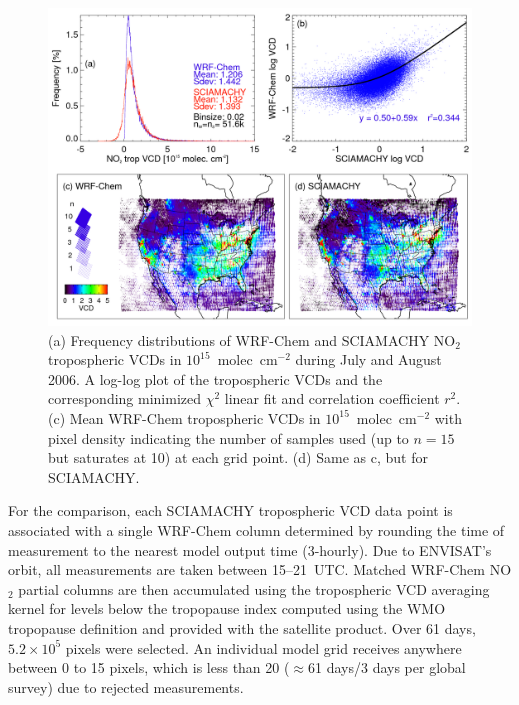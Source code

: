  \begin{figure}
 \noindent\includegraphics[width=40pc]{figures/scia_no2.png}
 \caption{(a) Frequency distributions of WRF-Chem and SCIAMACHY NO$_2$ tropospheric
VCDs in $10^{15}$~molec~cm$^{-2}$ during July and August 2006. A log-log plot of the
tropospheric VCDs and the corresponding minimized $\chi^2$ linear fit and correlation
coefficient $r^2$. (c) Mean WRF-Chem tropospheric VCDs in $10^{15}$~molec~cm$^{-2}$
with pixel density indicating the number of samples used (up to $n=15$ but saturates at
10) at each grid point. (d) Same as c, but for SCIAMACHY.}
 \label{fig:scia_no2}
 \end{figure}

For the comparison, each SCIAMACHY tropospheric VCD data point is associated with
a single WRF-Chem column determined by rounding the time of measurement to the
nearest model output time (3-hourly). Due to ENVISAT's orbit, all measurements are
taken between 15--21~UTC. Matched WRF-Chem NO$_2$ partial columns are then
accumulated using the tropospheric VCD averaging kernel for levels below the
tropopause index computed using the WMO tropopause definition and provided with the satellite product. Over 61 days,
$5.2\times10^5$ pixels were selected. An individual model grid receives anywhere between 0
to 15 pixels, which is less than 20 ($\approx$61 days/3 days per global survey) due
to rejected measurements.

